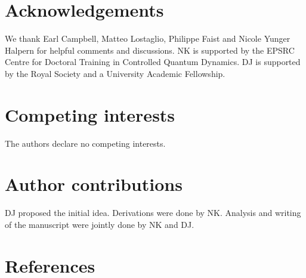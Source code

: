 \documentclass[
onecolumn,
superscriptaddress
]{revtex4-1}
\begin{document}
\section*{Acknowledgements}
We thank Earl Campbell, Matteo Lostaglio, Philippe Faist and Nicole Yunger Halpern for helpful comments and discussions. NK is supported by the EPSRC Centre for Doctoral Training in Controlled Quantum Dynamics. DJ is supported by the Royal Society and a University Academic Fellowship.

\section*{Competing interests}
The authors declare no competing interests.

\section*{Author contributions}
DJ proposed the initial idea. 
Derivations were done by NK. 
Analysis and writing of the manuscript were jointly done by NK and DJ.

\section*{References}
\end{document}
